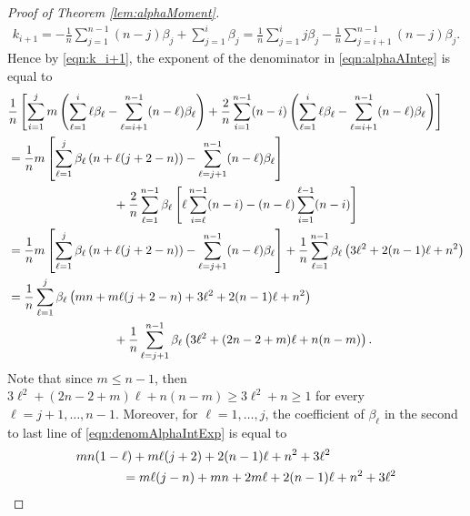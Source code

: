 \documentclass[11pt,a4paper,reqno]{amsart}
\theoremstyle{definition}
\theoremstyle{remark}
\numberwithin{equation}{section}
\begin{document}
\begin{proof}[Proof of Theorem \ref{lem:alphaMoment}]
    \begin{equation}
    \begin{split}
    \label{eqn:k_i+1}
    k_{i+1}=-\frac{1}{n}\sum_{j=1}^{n-1}(n-j)\beta_j+\sum_{j=1}^i\beta_j=\frac{1}{n}\sum_{j=1}^ij\beta_j-\frac{1}{n}\sum_{j=i+1}^{n-1}(n-j)\beta_j.
    \end{split}
    \end{equation}
    Hence by \eqref{eqn:k_i+1}, the exponent of the denominator in \eqref{eqn:alphaAInteg} is equal to 
    \begin{equation}
    \begin{split}
    \label{eqn:denomAlphaIntExp}
        &\frac{1}{n}\left[\sum_{i=1}^jm\left(\sum_{\ell=1}^i\ell\beta_{\ell}-\sum_{\ell=i+1}^{n-1}(n-\ell)\beta_{\ell}\right)+\frac{2}{n}\sum_{i=1}^{n-1}(n-i)\left(\sum_{\ell=1}^i\ell\beta_{\ell}-\sum_{\ell=i+1}^{n-1}(n-\ell)\beta_{\ell}\right)\right]\\
        &=\frac{1}{n}m\left[\sum_{\ell=1}^j\beta_{\ell}\left(n+\ell(j+2-n)\right)-\sum_{\ell=j+1}^{n-1}(n-\ell)\beta_{\ell}\right]\\
        &\hspace{1.2in}+\frac{2}{n}\sum_{\ell=1}^{n-1}\beta_{\ell}\left[\ell\sum_{i=\ell}^{n-1}(n-i)-(n-\ell)\sum_{i=1}^{\ell-1}(n-i)\right]\\
        &=\frac{1}{n}m\left[\sum_{\ell=1}^j\beta_{\ell}\left(n+\ell(j+2-n)\right)-\sum_{\ell=j+1}^{n-1}(n-\ell)\beta_{\ell}\right]+\frac{1}{n}\sum_{\ell=1}^{n-1}\beta_{\ell}\left(3\ell^2+2(n-1)\ell+n^2\right)\\
        &=\frac{1}{n}\sum_{\ell=1}^j\beta_{\ell}\left(mn+m\ell(j+2-n)+3\ell^2+2(n-1)\ell+n^2\right)\\
        &\hspace{1.2in}+\frac{1}{n}\sum_{\ell=j+1}^{n-1}\beta_{\ell}\left(3\ell^2+(2n-2+m)\ell+n(n-m)\right).
    \end{split}
    \end{equation}
    Note that since $m\leq n-1$, then $3\ell^2+(2n-2+m)\ell+n(n-m)\geq 3\ell^2+n\geq 1$ for every $\ell=j+1,\dots,n-1$. Moreover, for $\ell=1,\dots,j$, the coefficient of $\beta_{\ell}$ in the second to last line of \eqref{eqn:denomAlphaIntExp} is equal to
    \begin{equation}\begin{split}\label{eqn:ellSmallExp}
    &mn(1-\ell)+m\ell(j+2)+2(n-1)\ell+n^2+3\ell^2\\
    &\hspace{0.5in}=m\ell(j-n)+mn+2m\ell+2(n-1)\ell+n^2+3\ell^2\\

\end{split}
\end{equation}
\end{proof}
\end{document}
